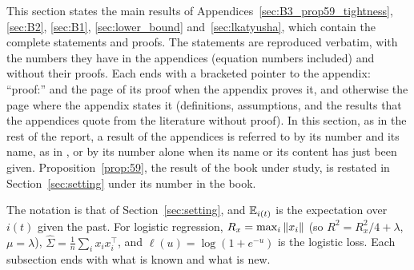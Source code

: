This section states the main results of Appendices~\ref{sec:B3_prop59_tightness}, \ref{sec:B2}, \ref{sec:B1},
\ref{sec:lower_bound} and~\ref{sec:lkatyusha}, which contain the complete statements and proofs. The statements are
reproduced verbatim, with the numbers they have in the appendices (equation numbers included) and without their
proofs. Each ends with a bracketed pointer to the appendix: ``proof:'' and the page of its proof when the appendix
proves it, and otherwise the page where the appendix states it (definitions, assumptions, and the results that the
appendices quote from the literature without proof). In this section, as in the rest of the report, a result of the appendices is referred
to by its number and its name, as in , or by its number alone when its name or its content
has just been given.
Proposition~\ref{prop:59}, the result of the book under study, is restated in Section~\ref{sec:setting} under its
number in the book.

The notation is that of Section~\ref{sec:setting}, and $\mathbb{E}_{i(t)}$ is the expectation over $i(t)$ given the past. For logistic
regression, $R_x=\max_i\left\|x_i\right\|$ (so $R^2=R_x^2/4+\lambda$, $\mu=\lambda$), $\hat\Sigma=\frac1n\sum_ix_ix_i^\top$, and
$\ell(u)=\log(1+e^{-u})$ is the logistic loss. Each subsection ends with what is known and what is new.
